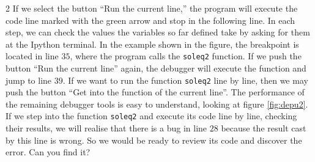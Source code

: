 \begin{paracol}{2}
If we select the button ``Run the current line,'' the program will execute the code line marked with the green arrow and stop in the following line. In each step, we can check the values the variables so far defined take by asking for them at the Ipython terminal. In the example shown in the figure, the breakpoint is located in line $35$, where the program calls the \texttt{soleq2} function. If we push the button ``Run the current line'' again, the debugger will execute the function and jump to line $39$. If we want to run the function \texttt{soleq2} line by line, then we may push the button ``Get into the function of the current line''. The performance of the remaining debugger tools is easy to understand, looking at figure \ref{fig:depu2}. If we step into the function \texttt{soleq2} and execute its code line by line, checking their results, we will realise that there is a bug in line $28$ because the result cast by this line is wrong. So we would be ready to review its code and discover the error. Can you find it?
\end{paracol}

